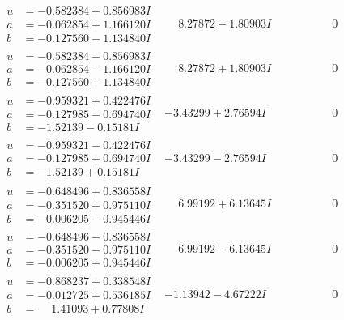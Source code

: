 \documentclass[1p]{elsarticle_modified}
\theoremstyle{definition}
\begin{document}
$$\begin{array}{c|c|c}
\begin{aligned}
u &= -0.582384 + 0.856983 I \\
a &= -0.062854 + 1.166120 I \\
b &= -0.127560 - 1.134840 I\end{aligned}
 & \phantom{-}8.27872 - 1.80903 I & \phantom{-0.000000 } 0 \\ \hline\begin{aligned}
u &= -0.582384 - 0.856983 I \\
a &= -0.062854 - 1.166120 I \\
b &= -0.127560 + 1.134840 I\end{aligned}
 & \phantom{-}8.27872 + 1.80903 I & \phantom{-0.000000 } 0 \\ \hline\begin{aligned}
u &= -0.959321 + 0.422476 I \\
a &= -0.127985 - 0.694740 I \\
b &= -1.52139 - 0.15181 I\end{aligned}
 & -3.43299 + 2.76594 I & \phantom{-0.000000 } 0 \\ \hline\begin{aligned}
u &= -0.959321 - 0.422476 I \\
a &= -0.127985 + 0.694740 I \\
b &= -1.52139 + 0.15181 I\end{aligned}
 & -3.43299 - 2.76594 I & \phantom{-0.000000 } 0 \\ \hline\begin{aligned}
u &= -0.648496 + 0.836558 I \\
a &= -0.351520 + 0.975110 I \\
b &= -0.006205 - 0.945446 I\end{aligned}
 & \phantom{-}6.99192 + 6.13645 I & \phantom{-0.000000 } 0 \\ \hline\begin{aligned}
u &= -0.648496 - 0.836558 I \\
a &= -0.351520 - 0.975110 I \\
b &= -0.006205 + 0.945446 I\end{aligned}
 & \phantom{-}6.99192 - 6.13645 I & \phantom{-0.000000 } 0 \\ \hline\begin{aligned}
u &= -0.868237 + 0.338548 I \\
a &= -0.012725 + 0.536185 I \\
b &= \phantom{-}1.41093 + 0.77808 I\end{aligned}
 & -1.13942 - 4.67222 I & \phantom{-0.000000 } 0 \\ \hline\begin{aligned}

\end{aligned}
\end{array}$$
\end{document}
